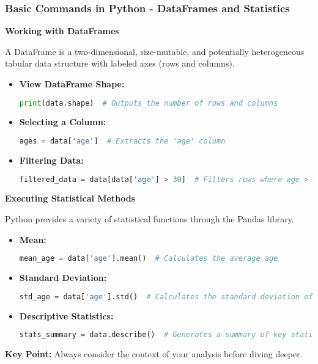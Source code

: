 \documentclass[aspectratio=169]{beamer}
\begin{document}
\begin{frame}[fragile]
    \frametitle{Basic Commands in Python - DataFrames and Statistics}
    \textbf{Working with DataFrames}

    A DataFrame is a two-dimensional, size-mutable, and potentially heterogeneous tabular data structure with labeled axes (rows and columns).
    
    \begin{itemize}
        \item \textbf{View DataFrame Shape:}
        \begin{lstlisting}[language=Python]
print(data.shape)  # Outputs the number of rows and columns
        \end{lstlisting}

        \item \textbf{Selecting a Column:}
        \begin{lstlisting}[language=Python]
ages = data['age']  # Extracts the 'age' column
        \end{lstlisting}

        \item \textbf{Filtering Data:}
        \begin{lstlisting}[language=Python]
filtered_data = data[data['age'] > 30]  # Filters rows where age > 30
        \end{lstlisting}
    \end{itemize}

    \textbf{Executing Statistical Methods}

    Python provides a variety of statistical functions through the Pandas library.
    
    \begin{itemize}
        \item \textbf{Mean:}
        \begin{lstlisting}[language=Python]
mean_age = data['age'].mean()  # Calculates the average age
        \end{lstlisting}
        \item \textbf{Standard Deviation:}
        \begin{lstlisting}[language=Python]
std_age = data['age'].std()  # Calculates the standard deviation of ages
        \end{lstlisting}
        \item \textbf{Descriptive Statistics:}
        \begin{lstlisting}[language=Python]
stats_summary = data.describe()  # Generates a summary of key statistics
        \end{lstlisting}
    \end{itemize}
    
    \textbf{Key Point:} Always consider the context of your analysis before diving deeper.
\end{frame}
\end{document}
